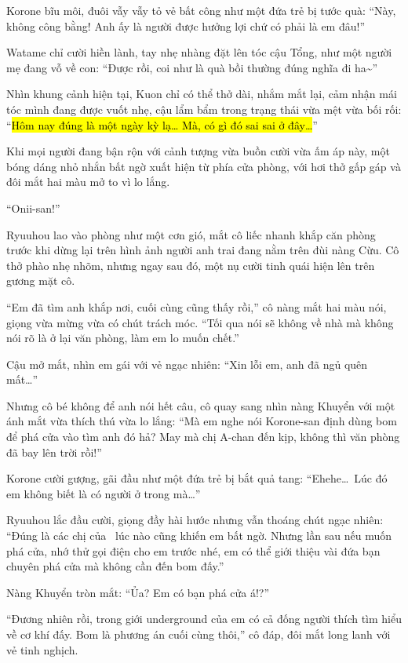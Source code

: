 \documentclass[../main.tex]{subfiles}
\begin{document}
Korone bĩu môi, đuôi vẫy vẫy tỏ vẻ bất công như một đứa trẻ bị tước quà: ``Này, không công bằng! Anh ấy là người được hưởng lợi chứ có phải là em đâu!''

Watame chỉ cười hiền lành, tay nhẹ nhàng đặt lên tóc cậu Tổng, như một người mẹ đang vỗ về con: ``Được rồi, coi như là quà bồi thường đúng nghĩa đi ha\~{}''

Nhìn khung cảnh hiện tại, Kuon chỉ có thể thở dài, nhắm mắt lại, cảm nhận mái tóc mình đang được vuốt nhẹ, cậu lẩm bẩm trong trạng thái vừa mệt vừa bối rối: ``\hl{Hôm nay đúng là một ngày kỳ lạ\dots{} Mà, có gì đó sai sai ở đây\dots}''

Khi mọi người đang bận rộn với cảnh tượng vừa buồn cười vừa ấm áp này, một bóng dáng nhỏ nhắn bất ngờ xuất hiện từ phía cửa phòng, với hơi thở gấp gáp và đôi mắt hai màu mở to vì lo lắng.

``Onii-san!''

Ryuuhou lao vào phòng như một cơn gió, mắt cô liếc nhanh khắp căn phòng trước khi dừng lại trên hình ảnh người anh trai đang nằm trên đùi nàng Cừu. Cô thở phào nhẹ nhõm, nhưng ngay sau đó, một nụ cười tinh quái hiện lên trên gương mặt cô.

``Em đã tìm anh khắp nơi, cuối cùng cũng thấy rồi,'' cô nàng mắt hai màu nói, giọng vừa mừng vừa có chút trách móc. ``Tối qua nói sẽ không về nhà mà không nói rõ là ở lại văn phòng, làm em lo muốn chết.''

Cậu mở mắt, nhìn em gái với vẻ ngạc nhiên: ``Xin lỗi em, anh đã ngủ quên mất\dots''

Nhưng cô bé không để anh nói hết câu, cô quay sang nhìn nàng Khuyển với một ánh mắt vừa thích thú vừa lo lắng: ``Mà em nghe nói Korone-san định dùng bom để phá cửa vào tìm anh đó hả? May mà chị A-chan đến kịp, không thì văn phòng đã bay lên trời rồi!''

Korone cười gượng, gãi đầu như một đứa trẻ bị bắt quả tang: ``Ehehe\dots\ Lúc đó em không biết là có người ở trong mà\dots''

Ryuuhou lắc đầu cười, giọng đầy hài hước nhưng vẫn thoáng chút ngạc nhiên: ``Đúng là các chị của \hll\ lúc nào cũng khiến em bất ngờ. Nhưng lần sau nếu muốn phá cửa, nhớ thử gọi điện cho em trước nhé, em có thể giới thiệu vài đứa bạn chuyên phá cửa mà không cần đến bom đấy.''

Nàng Khuyển tròn mắt: ``Ủa? Em có bạn phá cửa á!?''

``Đương nhiên rồi, trong giới underground của em có cả đống người thích tìm hiểu về cơ khí đấy. Bom là phương án cuối cùng thôi,'' cô đáp, đôi mắt long lanh với vẻ tinh nghịch.
\end{document}

